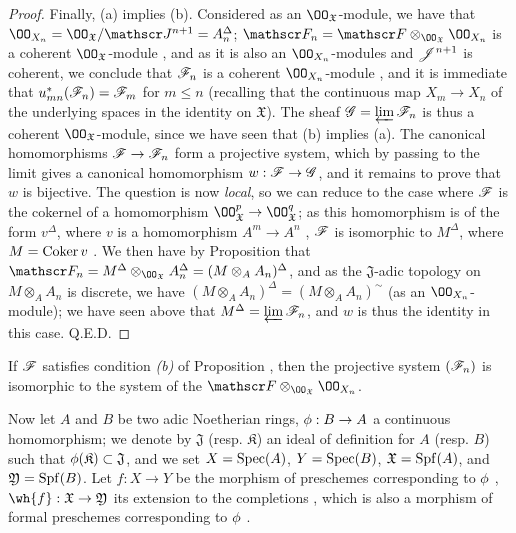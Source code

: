 \begin{proof}
Finally, (a) implies (b).
Considered as an $\OO_\mathfrak{X}$-module, we have that $\OO_{X_n}=\OO_\mathfrak{X}/\sh{J}^{n+1}=A_n^\Delta$; $\sh{F}_n=\sh{F}\otimes_{\OO_\mathfrak{X}}\OO_{X_n}$ is a coherent $\OO_\mathfrak{X}$-module , and as it is also an $\OO_{X_n}$-modules and $\mathscr{J}^{n+1}$ is coherent, we conclude that $\mathscr{F}_n$ is a coherent $\OO_{X_n}$-module , and it is immediate that $u_{mn}^*(\mathscr{F}_n)=\mathscr{F}_m$ for $m\leq n$ (recalling that the continuous map $X_m\to X_n$ of the underlying spaces in the identity on $\mathfrak{X}$).
The sheaf $\mathscr{G}=\varprojlim\mathscr{F}_n$ is thus a coherent $\OO_\mathfrak{X}$-module, since we have seen that (b) implies (a). The canonical homomorphisms $\sh{F}\to\sh{F}_n$ form a projective system, which by passing to the limit gives a canonical homomorphism $w:\sh{F}\to\sh{G}$, and it remains to prove that $w$ is bijective.
The question is now \emph{local}, so we can reduce to the case where $\mathscr{F}$ is the cokernel of a homomorphism $\OO_\mathfrak{X}^p\to\OO_\mathfrak{X}^q$; as this homomorphism is of the form $v^\Delta$, where $v$ is a homomorphism $A^m\to A^n$ , $\mathscr{F}$ is isomorphic to $M^\Delta$, where $M=\operatorname{Coker}{v}$ .
We then have by Proposition  that $\sh{F}_n=M^\Delta\otimes_{\OO_\mathfrak{X}}A_n^\Delta=(M\otimes_A A_n)^\Delta$, and as the $\mathfrak{J}$-adic topology on $M\otimes_A A_n$ is discrete, we have $(M\otimes_A A_n)^\Delta=(M\otimes_A A_n)^\sim$ (as an $\OO_{X_n}$-module); we have seen above that $M^\Delta=\varprojlim\mathscr{F}_n$, and $w$ is thus the identity in this case.
Q.E.D.
\end{proof}

\begin{cor}[10.10.6]
\label{1.10.10.6}
If $\mathscr{F}$ satisfies condition \emph{(b)} of Proposition , then the projective system $(\mathscr{F}_n)$ is isomorphic to the system of the $\sh{F}\otimes_{\OO_\mathfrak{X}}\OO_{X_n}$.
\end{cor}

\begin{env}[10.10.7]
\label{1.10.10.7}
Now let $A$ and $B$ be two adic Noetherian rings, $\vphi:B\to A$ a continuous homomorphism; we denote by $\mathfrak{J}$ (resp. $\mathfrak{K}$) an ideal of definition for $A$ (resp. $B$) such that $\phi(\mathfrak{K})\subset\mathfrak{J}$, and we set $X=\operatorname{Spec}(A)$, $Y=\operatorname{Spec}(B)$, $\mathfrak{X}=\operatorname{Spf}(A)$, and $\mathfrak{Y}=\operatorname{Spf}(B)$.
Let $f:X\to Y$ be the morphism of preschemes corresponding to $\phi$ , $\wh{f}:\mathfrak{X}\to\mathfrak{Y}$ its extension to the completions , which is also a morphism of formal preschemes corresponding to $\phi$ .
\end{env}

